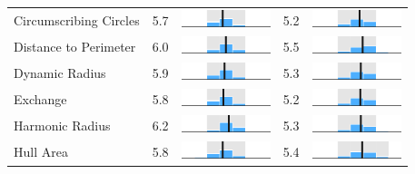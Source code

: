 \begin{table}
\begin{tabular}{l rm{7em} rm{7em}}
Circumscribing Circles &   5.7 &        \includegraphics[width=7em]{mini_hist/NC_race_2012_reock} &   5.2 &        \includegraphics[width=7em]{mini_hist/NC_race_2016_reock} \\
Distance to Perimeter  &   6.0 &     \includegraphics[width=7em]{mini_hist/NC_race_2012_rohrbach} &   5.5 &     \includegraphics[width=7em]{mini_hist/NC_race_2016_rohrbach} \\
Dynamic Radius         &   5.9 &   \includegraphics[width=7em]{mini_hist/NC_race_2012_dyn_radius} &   5.3 &   \includegraphics[width=7em]{mini_hist/NC_race_2016_dyn_radius} \\
Exchange               &   5.8 &     \includegraphics[width=7em]{mini_hist/NC_race_2012_exchange} &   5.2 &     \includegraphics[width=7em]{mini_hist/NC_race_2016_exchange} \\
Harmonic Radius        &   6.2 &  \includegraphics[width=7em]{mini_hist/NC_race_2012_harm_radius} &   5.3 &  \includegraphics[width=7em]{mini_hist/NC_race_2016_harm_radius} \\
Hull Area              &   5.8 &       \includegraphics[width=7em]{mini_hist/NC_race_2012_hull_a} &   5.4 &       \includegraphics[width=7em]{mini_hist/NC_race_2016_hull_a} \\

\end{tabular}
\end{table}
